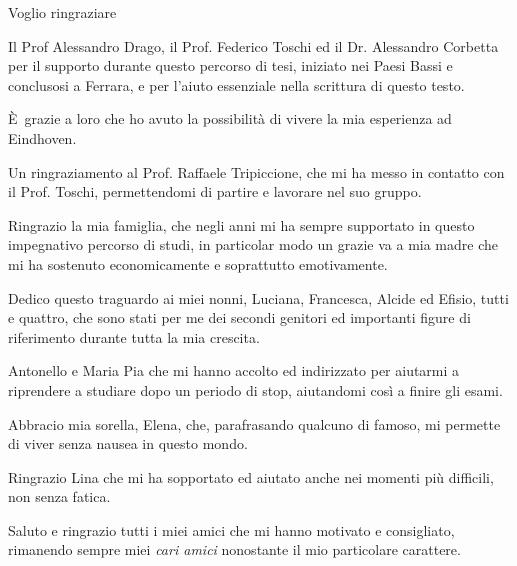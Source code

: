 \documentclass{standalone}
\begin{document}
Voglio ringraziare 

Il Prof Alessandro Drago, il Prof. Federico Toschi ed il Dr. Alessandro Corbetta per il supporto durante questo percorso di tesi, iniziato nei Paesi Bassi e conclusosi a Ferrara, e per l'aiuto essenziale nella scrittura di questo testo.

È grazie a loro che ho avuto la possibilità di vivere la mia esperienza ad Eindhoven.

Un ringraziamento al Prof. Raffaele Tripiccione, che mi ha messo in contatto con il Prof. Toschi, permettendomi di partire e lavorare nel suo gruppo.

Ringrazio la mia famiglia, che negli anni mi ha sempre supportato in questo impegnativo percorso di studi, in particolar modo un grazie va a mia madre che mi ha sostenuto economicamente e soprattutto emotivamente.

Dedico questo traguardo ai miei nonni, Luciana, Francesca, Alcide ed Efisio, tutti e quattro, che sono stati per me dei secondi genitori ed importanti figure di riferimento durante tutta la mia crescita.

Antonello e Maria Pia che mi hanno accolto ed indirizzato per aiutarmi a riprendere a studiare dopo un periodo di stop, aiutandomi così a finire gli esami.

Abbracio mia sorella, Elena, che, parafrasando qualcuno di famoso, mi permette di viver senza nausea in questo mondo.

Ringrazio Lina che mi ha sopportato ed aiutato anche nei momenti più difficili, non senza fatica.

Saluto e ringrazio tutti i miei amici che mi hanno motivato e consigliato, rimanendo sempre miei \emph{cari amici} nonostante il mio particolare carattere.
\end{document}
